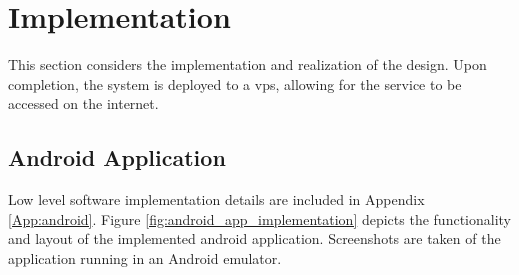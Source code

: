 \section{Implementation}
This section considers the implementation and realization of the design.
Upon completion, the system is deployed to a \Ac{vps}, allowing for the service to be accessed on the internet.

\subsection{Android Application}
Low level software implementation details are included in Appendix \ref{App:android}.
Figure \ref{fig:android_app_implementation} depicts the functionality and layout of the implemented android application.
Screenshots are taken of the application running in an Android emulator.

